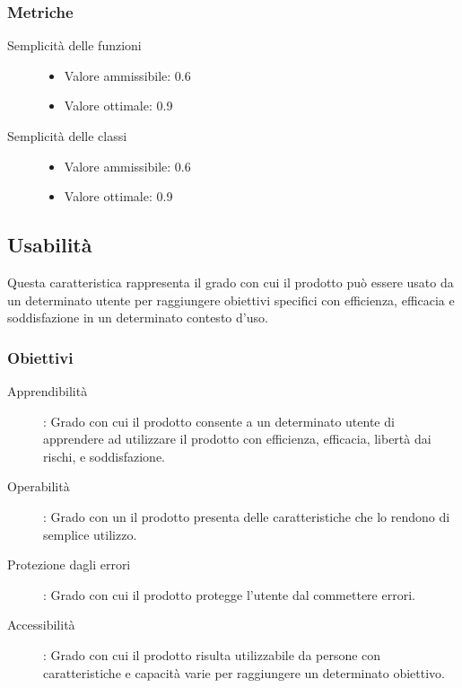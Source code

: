 \documentclass[../piano-di-qualifica.tex]{subfiles}
\begin{document}
\subsubsection{Metriche}%
\label{subs:metriche}
  \begin{description}
    \item [Semplicità delle funzioni]
      \begin{itemize} \item Valore ammissibile: 0.6 \item Valore ottimale: 0.9 \end{itemize}
    \item [Semplicità delle classi]
      \begin{itemize} \item Valore ammissibile: 0.6 \item Valore ottimale: 0.9 \end{itemize}
  \end{description}


\subsection{Usabilità}%
\label{sub:usabilita}
Questa caratteristica rappresenta il grado con cui il prodotto può essere usato da un determinato utente per raggiungere obiettivi specifici con efficienza, efficacia e soddisfazione in un determinato contesto d'uso.
\subsubsection{Obiettivi}%
\label{subs:obiettivi}
      \begin{description}
        \item [Apprendibilità]: Grado con cui il prodotto consente a un determinato utente di apprendere ad utilizzare il prodotto con efficienza, efficacia, libertà dai rischi, e soddisfazione.
        \item [Operabilità]: Grado con un il prodotto presenta delle caratteristiche che lo rendono di semplice utilizzo.
        \item [Protezione dagli errori]: Grado con cui il prodotto protegge l'utente dal commettere errori.
        \item [Accessibilità]: Grado con cui il prodotto risulta utilizzabile da persone con caratteristiche e capacità varie per raggiungere un determinato obiettivo.
      \end{description}
\end{document}
